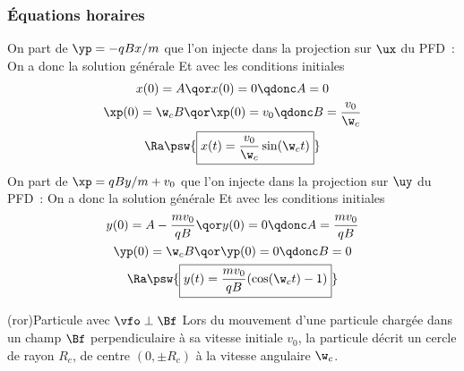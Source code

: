\documentclass[../../main/main.tex]{subfiles}
\begin{document}
\subsubsection{Équations horaires}
\begin{itemize}[label=$\diamond$]
	 On part de $\yp = -qBx/m$ que l'on injecte dans la
	projection sur $\ux$ du PFD~:
	On a donc la solution générale
	Et avec les conditions initiales
	\begin{gather*}
		x(0) = A
		\qor
		x(0) = 0
		\qdonc
		A = 0
		\\
		\xp(0) = \w_cB
		\qor
		\xp(0) = v_0
		\qdonc
		B = \frac{v_0}{\w_c}
		\\\Ra
		\psw{\boxed{x(t) = \frac{v_0}{\w_c}\sin(\w_ct)}}
	\end{gather*}
	 On part de $\xp = qBy/m + v_0$ que l'on injecte dans la
	projection sur $\uy$ du PFD~:
	On a donc la solution générale
	Et avec les conditions initiales
	\begin{gather*}
		y(0) = A - \frac{mv_0}{qB}
		\qor
		y(0) = 0
		\qdonc
		A = \frac{mv_0}{qB}
		\\
		\yp(0) = \w_cB
		\qor
		\yp(0) = 0
		\qdonc
		B = 0
		\\\Ra
		\psw{\boxed{y(t) = \frac{mv_0}{qB}(\cos(\w_ct)-1)}}
	\end{gather*}
\end{itemize}
\begin{tcb*}(ror){Particule avec $\protect\vfo \perp \protect\Bf$}
	Lors du mouvement d'une particule chargée dans un champ $\Bf$
	perpendiculaire à sa vitesse initiale $v_0$, la particule décrit un cercle de
	rayon $R_c$, de centre $(0,\pm R_c)$ à la vitesse angulaire $\w_c$.
\end{tcb*}
\end{document}
